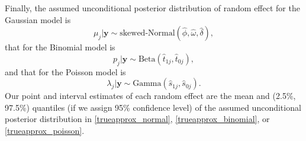 \documentclass[article]{jss}
\begin{document}
Finally, the assumed unconditional posterior distribution of random effect for the Gaussian model is
\begin{equation}\label{trueapprox_normal}
\mu_j\vert \boldsymbol{y} \sim \textrm{skewed-Normal}(\hat{\phi}, \hat{\omega}, \hat{\delta}),
\end{equation}
that for the Binomial model is
\begin{equation}\label{trueapprox_binomial}
p_j\vert \boldsymbol{y} \sim \textrm{Beta}(\hat{t}_{1j}, \hat{t}_{0j}),
\end{equation}
and that for the Poisson model is
\begin{equation}\label{trueapprox_poisson}
\lambda_j\vert \boldsymbol{y} \sim \textrm{Gamma}(\hat{s}_{1j}, \hat{s}_{0j}).
\end{equation}
Our point and interval estimates of each random effect are the mean and (2.5\%, 97.5\%) quantiles (if we assign 95\% confidence level) of the assumed unconditional posterior distribution in  \eqref{trueapprox_normal}, \eqref{trueapprox_binomial}, or \eqref{trueapprox_poisson}.









\end{document}
